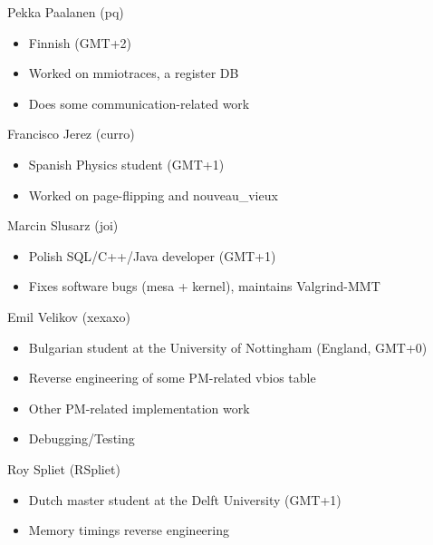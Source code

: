 \documentclass[11pt,english,compress]{beamer}
\begin{document}
		\begin{frame}
			\begin{block}{Pekka Paalanen (pq)}
				\begin{itemize}
					\item Finnish (GMT+2)
					\item Worked on mmiotraces, a register DB
					\item Does some communication-related work
				\end{itemize}
			\end{block}

			\begin{block}{Francisco Jerez (curro)}
				\begin{itemize}
					\item Spanish Physics student (GMT+1)
					\item Worked on page-flipping and nouveau\_vieux
				\end{itemize}
			\end{block}

			\begin{block}{Marcin Slusarz (joi)}
				\begin{itemize}
					\item Polish SQL/C++/Java developer (GMT+1)
					\item Fixes software bugs (mesa + kernel), maintains Valgrind-MMT
				\end{itemize}
			\end{block}
		\end{frame}

		\begin{frame}
			\begin{block}{Emil Velikov (xexaxo)}
				\begin{itemize}
					\item Bulgarian student at the University of Nottingham (England, GMT+0)
					\item Reverse engineering of some PM-related vbios table
					\item Other PM-related implementation work
					\item Debugging/Testing
				\end{itemize}
			\end{block}

			\begin{block}{Roy Spliet (RSpliet)}
				\begin{itemize}
					\item Dutch master student at the Delft University (GMT+1)
					\item Memory timings reverse engineering
				\end{itemize}
			\end{block}
		\end{frame}
\end{document}
